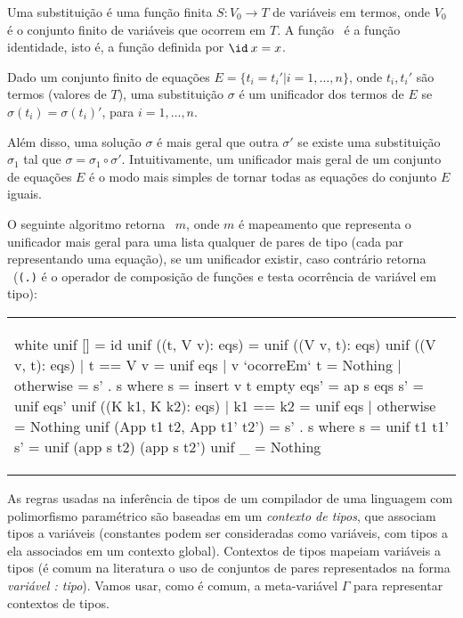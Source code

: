 Uma substituição é uma função finita $S: V_0 \rightarrow T$ de
variáveis em termos, onde $V_0$ é o conjunto finito de variáveis que
ocorrem em $T$. A função \id\ é a função identidade, isto é, a função
definida por $\id\: x = x$.

Dado um conjunto finito de equações $E = \{ t_i=t_i'|i=1,\ldots,n\}$,
onde $t_i, t_i'$ são termos (valores de $T$), uma substituição
$\sigma$ é um unificador dos termos de $E$ se
$\sigma(t_i)=\sigma(t_i)'$, para $i=1,\ldots,n$.

Além disso, uma solução $\sigma$ é mais geral que outra $\sigma'$ se
existe uma substituição $\sigma_1$ tal que
$\sigma=\sigma_1\circ\sigma'$. Intuitivamente, um unificador mais
geral de um conjunto de equações $E$ é o modo mais simples de tornar
todas as equações do conjunto $E$ iguais.

O seguinte algoritmo retorna \Just\ $m$, onde $m$ é mapeamento que
representa o unificador mais geral para uma lista qualquer de pares de
tipo (cada par representando uma equação), se um unificador existir,
caso contrário retorna \Nothing\ ({\tt (.)} é o operador de composição
de funções e  testa ocorrência de variável em tipo):

\begin{center}
\begin{tabular}{l}
\begin{alg}{.9\textwidth}{white}
unif [] = id 
unif ((t, V v): eqs)          = unif ((V v, t): eqs)  
unif ((V v, t): eqs)                                  
  | t == V v                  = unif eqs              
  | v `ocorreEm` t            = Nothing               
  | otherwise                 = s' . s                
  where                                               
    s    = insert v t empty                           
    eqs' = ap s eqs                                   
    s'   = unif eqs'                                  
unif ((K k1, K k2): eqs)                              
  | k1 == k2                  = unif eqs              
  | otherwise                 = Nothing               
unif (App t1 t2, App t1' t2') = s' . s                
  where s  = unif t1 t1'                              
        s' = unif (app s t2) (app s t2')              
unif _                        = Nothing               
\end{alg}
\end{tabular}
\end{center}

As regras usadas na inferência de tipos de um compilador de uma
linguagem com polimorfismo paramétrico são baseadas em um {\em
  contexto de tipos\/}, que associam tipos a variáveis (constantes
podem ser consideradas como variáveis, com tipos a ela associados em
um contexto global). Contextos de tipos mapeiam variáveis a tipos (é
comum na literatura o uso de conjuntos de pares representados na forma
{\em variável : tipo\/}). Vamos usar, como é comum, a meta-variável
$\Gamma$ para representar contextos de tipos.

